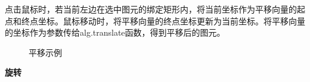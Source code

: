 \documentclass[a4paper,UTF8]{article}
\begin{document}
点击鼠标时，若当前左边在选中图元的绑定矩形内，将当前坐标作为平移向量的起点和终点坐标。鼠标移动时，将平移向量的终点坐标更新为当前坐标。将平移向量的坐标作为参数传给alg.translate函数，得到平移后的图元。
\begin{figure}[H]
    \centering
        \caption{平移示例}
\end{figure}


\textbf{旋转}
\end{document}
